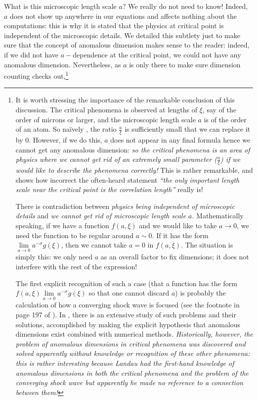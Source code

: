 \documentclass[12pt]{article}
\numberwithin{equation}{section}
\def\naively{naïvely }
\begin{document}
What is this microscopic length scale $a$? We really do not need to know! Indeed, $a$ does not show up anywhere in our equations and affects nothing about the computations: this is why it is stated that the physics at critical point is independent of the microscopic details. We detailed this subtlety just to make sure that the concept of anomalous dimension makes sense to the reader: indeed, if we did not have $a-$dependence at the critical point, we could not have any anomalous dimension. Nevertheless, as $a$ is only there to make sure dimension counting checks out,\footnote{
It is worth stressing the importance of the remarkable conclusion of this discussion. The critical phenomena is observed at lengths of $\xi$, say of the order of microns or larger, and the microscopic length scale $a$ is of the order of an atom. So \naively, the ratio $\frac{a}{\xi}$ is sufficiently small that we can replace it by $0$. However, if we do this, $a$ does not appear in any final formula hence we cannot get any anomalous dimension: \emph{so the critical phenomena is an area of physics where we cannot get rid of an extremely small parameter ($\frac{a}{\xi}$) if we would like to describe the phenomena correctly!} This is rather remarkable, and shows how incorrect the often-heard statement \emph{``the only important length scale near the critical point is the correlation length''} really is!

There is contradiction between \emph{physics being independent of microscopic details} and \emph{we cannot get rid of microscopic length scale $a$}. Mathematically speaking, if we have a function $f\left(a,\xi\right)$ and we would like to take $a\rightarrow 0$, we need the function to be regular around $a\sim 0$. If it has the form $\lim\limits_{a\rightarrow0}a^{-\sigma}g(\xi)$, then we cannot take $a=0$ in $f(a,\xi)$. The situation is simply this: we only need $a$ as an overall factor to fix dimensions; it does not interfere with the rest of the expression!

The first explicit recognition of such a case (that a function has the form $f(a,\xi)\lim\limits_{a\rightarrow0}a^{-\sigma}g(\xi)$ so that one cannot discard $a$) is probably the calculation of how a converging shock wave is focused (see the footnote in page 197 of \cite{Goldenfeld:1992qy}). In \cite{barenblatt1996scaling}, there is an extensive study of such problems and their solutions, accomplished by making the explicit hypothesis that anomalous dimensions exist combined with numerical methods. \emph{Historically, however, the problem of anomalous dimensions in critical phenomena was discovered and solved apparently without knowledge or recognition of these other phenomena: this is rather interesting because Landau had the first-hand knowledge of anomalous dimensions in both the critical phenomena and the problem of the converging shock wave but apparently he made no reference to a connection between them!}

}
\end{document}
